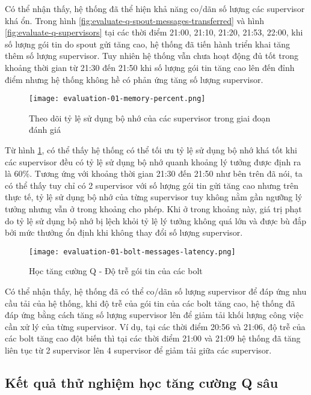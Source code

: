 Có thể nhận thấy, hệ thống đã thể hiện khả năng co/dãn số lượng các supervisor khá ổn. Trong hình \ref{fig:evaluate-q-spout-messages-transferred} và hình \ref{fig:evaluate-q-supervisors} tại các thời điểm 21:00, 21:10, 21:20, 21:53, 22:00, khi số lượng gói tin do spout gửi tăng cao, hệ thống đã tiến hành triển khai tăng thêm số lượng supervisor. Tuy nhiên hệ thống vẫn chưa hoạt động đủ tốt trong khoảng thời gian từ 21:30 đến 21:50 khi số lượng gói tin tăng cao lên đến đỉnh điểm nhưng hệ thống không hề có phản ứng tăng số lượng supervisor.

\begin{figure}[htbp]
    \centering
    \texttt{[image: evaluation-01-memory-percent.png]}
    \caption{Theo dõi tỷ lệ sử dụng bộ nhớ của các supervisor trong giai đoạn đánh giá}
    \label{fig:evaluate-d-memory-usage}
\end{figure}

Từ hình \ref{fig:evaluate-d-memory-usage}, có thể thấy hệ thống có thể tối ưu tỷ lệ sử dụng bộ nhớ khá tốt khi các supervisor đều có tỷ lệ sử dụng bộ nhớ quanh khoảng lý tưởng được định ra là 60\%. Tương ứng với khoảng thời gian 21:30 đến 21:50 như bên trên đã nói, ta có thể thấy tuy chỉ có 2 supervisor với số lượng gói tin gửi tăng cao nhưng trên thực tế, tỷ lệ sử dụng bộ nhớ của từng supervisor tuy không nằm gần ngưỡng lý tưởng nhưng vẫn ở trong khoảng cho phép. Khi ở trong khoảng này, giá trị phạt do tỷ lệ sử dụng bộ nhớ bị lệch khỏi tỷ lệ lý tưởng không quá lớn và được bù đắp bởi mức thưởng ổn định khi không thay đổi số lượng supervisor.

\begin{figure}[htbp]
    \centering
    \texttt{[image: evaluation-01-bolt-messages-latency.png]}
    \caption{Học tăng cường Q - Độ trễ gói tin của các bolt}
\end{figure}

Có thể nhận thấy, hệ thống đã có thể co/dãn số lượng supervisor để đáp ứng nhu cầu tải của hệ thống, khi độ trễ của gói tin của các bolt tăng cao, hệ thống đã đáp ứng bằng cách tăng số lượng supervisor lên để giảm tải khối lượng công việc cần xử lý của từng supervisor. Ví dụ, tại các thời điểm 20:56 và 21:06, độ trễ của các bolt tăng cao đột biến thì tại các thời điểm 21:00 và 21:09 hệ thống đã tăng liên tục từ 2 supervisor lên 4 supervisor để giảm tải giữa các supervisor.

\subsection{Kết quả  thử nghiệm học tăng cường Q sâu}

